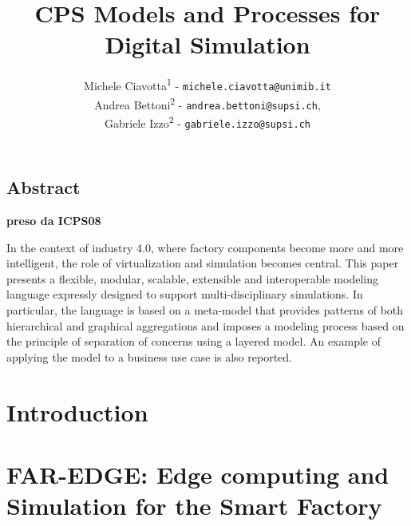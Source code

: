 \documentclass{riverk}
\begin{document}
\setcounter{article}{7}

\begin{opening}
\title[CPS Models and Processes for Digital Simulation]{CPS Models and Processes for Digital Simulation %
            }
\author{Michele Ciavotta\textsuperscript{1} - \texttt{michele.ciavotta@unimib.it}\\
        Andrea Bettoni\textsuperscript{2} - \texttt{andrea.bettoni@supsi.ch},\\
	    Gabriele Izzo\textsuperscript{2} - \texttt{gabriele.izzo@supsi.ch}}
\end{opening}

\subsection*{Abstract}
\textbf{preso da ICPS08}

In the context of industry 4.0, where factory components become more and more intelligent, the role of virtualization and simulation becomes central. This paper presents a flexible, modular, scalable, extensible and interoperable modeling language expressly designed to support multi-disciplinary simulations. In particular, the language is based on a meta-model that provides patterns of both hierarchical and graphical aggregations and imposes a modeling process based on the principle of separation of concerns using a layered model. An example of applying the model to a business use case is also reported. 


\section{Introduction} 


\section{FAR-EDGE: Edge computing and Simulation for the Smart Factory}\label{sec:project}

\end{document}
